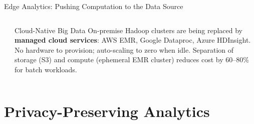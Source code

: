 \documentclass[aspectratio=169,10pt]{beamer}
\begin{document}
\begin{frame}{Edge Analytics: Pushing Computation to the Data Source}
\begin{columns}[T]
\begin{center}
      \end{center}
      \vspace{4pt}
      \begin{alertblock}{Cloud-Native Big Data}
        \small On-premise Hadoop clusters are being replaced by \textbf{managed cloud services}: AWS EMR, Google Dataproc, Azure HDInsight.  No hardware to provision; auto-scaling to zero when idle.  Separation of storage (S3) and compute (ephemeral EMR cluster) reduces cost by 60--80\% for batch workloads.
      \end{alertblock}
  \end{columns}
\end{frame}

\section{Privacy-Preserving Analytics}
\end{document}
